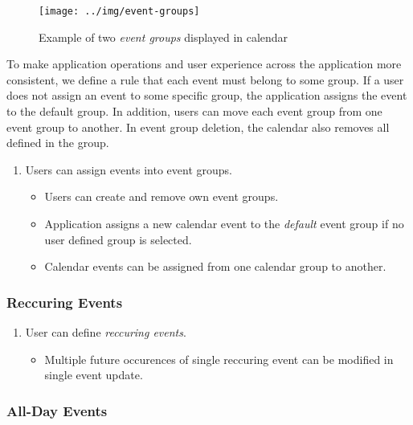 \begin{figure}[!htb]
	\centering
	\texttt{[image: ../img/event-groups]}
	\caption{Example of two \textit{event groups} displayed in calendar}
	\label{fig:spec:eventgroups}
\end{figure}

To make application operations and user experience across the application more consistent, we define a rule that each event must belong to some group. If a user does not assign an event to some specific group, the application assigns the event to the default group. In addition, users can move each event group from one event group to another. In event group deletion, the calendar also removes all defined in the group.

\begin{enumerate}[label=\color{reqcolor}\textbf{R{\arabic*}}, resume]
    \item \label{app:req:groups1} Users can assign events into event groups.
        \begin{itemize}
            \item Users can create and remove own event groups.
            \item Application assigns a new calendar event to the \textit{default} event group if no user defined group is selected.
            \item Calendar events can be assigned from one calendar group to another.
        \end{itemize}
\end{enumerate}

\subsubsection*{Reccuring Events}



\begin{enumerate}[label=\color{reqcolor}\textbf{R{\arabic*}}, resume]
    \item \label{app:req:events4} User can define \textit{reccuring events}.
        \begin{itemize}
            \item Multiple future occurences of single reccuring event can be modified in single event update.
        \end{itemize}
\end{enumerate}

\subsubsection*{All-Day Events}

